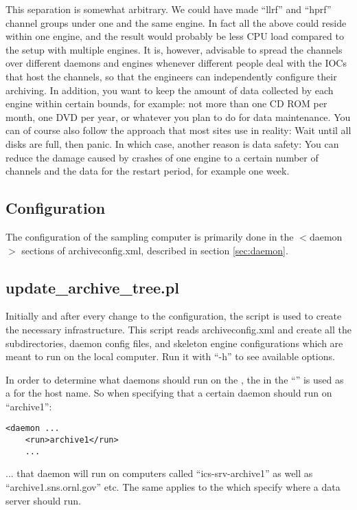 This separation is somewhat arbitrary. We could have made ``llrf'' and
``hprf'' channel groups under one and the same engine. In fact all the
above could reside within one engine, and the result would probably be
less CPU load compared to the setup with multiple engines.  It is,
however, advisable to spread the channels over different daemons and
engines whenever different people deal with the IOCs that host the
channels, so that the engineers can independently configure their
archiving.  In addition, you want to keep the amount of data collected
by each engine within certain bounds, for example: not more than one
CD ROM per month, one DVD per year, or whatever you plan to do for
data maintenance. You can of course also follow the approach that most
sites use in reality: Wait until all disks are full, then panic.
In which case, another reason is data safety: You can reduce the
damage caused by crashes of one engine to a certain number of channels
and the data for the restart period, for example one week.

\subsection{Configuration}
The configuration of the sampling computer is primarily done
in the $<$daemon$>$ sections of archiveconfig.xml, described in
section \ref{sec:daemon}.

\subsection{update\_archive\_tree.pl}
Initially and after every change to the configuration,
the  script is used to create the necessary
infrastructure.
This script reads archiveconfig.xml and create all the subdirectories,
daemon config files, and skeleton engine configurations which are
meant to run on the local computer.
Run it with ``-h'' to see available options.

\NOTE In order to determine what daemons should run on the
,
the  in the ``'' is used as a
 for the host name.
So when specifying that a certain daemon should run on ``archive1'':
\begin{lstlisting}[keywordstyle=\sffamily]
 <daemon ...
    <run>archive1</run>
    ...
\end{lstlisting}
... that daemon will run on computers called ``ics-srv-archive1'' as well
as ``archive1.sns.ornl.gov'' etc.
The same applies to the  which specify where a
data server should run.

